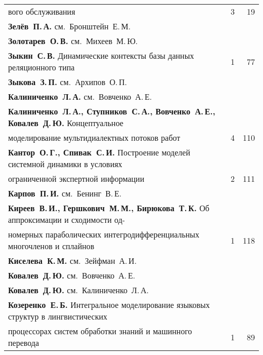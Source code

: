 {\begin{tabular}{p{388pt}rr}
\hspace*{23pt}во\-го обслуживания\dotfill&3&19\\
\textbf{Зелёв~П.\,А.} см.\ Бронштейн~Е.\,М.&&\\
\textbf{Золотарев~О.\,В.} см.\ Михеев~М.\,Ю.&&\\
\textbf{Зыкин~С.\,В.} Динамические контексты базы данных реляционного типа\dotfill&1&77\\
\textbf{Зыкова~З.\,П.} см.\ Архипов~О.\,П.&&\\
\textbf{Калиниченко~Л.\,А.} см.\ Вовченко~А.\,Е.&&\\
\textbf{Калиниченко~Л.\,А., Ступников~С.\,А., Вовченко~А.\,Е., Ковалев~Д.\,Ю.}
Концептуальное\linebreak
\vspace*{-12pt}\\
\hspace*{23pt}моделирование мультидиалектных потоков работ\dotfill&4&110\\
\textbf{Кантор~О.\,Г., Спивак~С.\,И.} Построение моделей системной динамики в
условиях\linebreak
\vspace*{-12pt}\\
\hspace*{23pt}ограниченной экспертной информации\dotfill&2&111\\
\textbf{Карпов~П.\,И.} см.\ Бенинг~В.\,Е.&&\\
\hangindent=23pt\noindent\textbf{Киреев~В.\,И., Гершкович~М.\,М., Бирюкова~Т.\,К.} Об аппроксимации и
сходимости од-\linebreak
\vspace*{-12pt}\\
\hspace*{23pt}номерных параболических интегродифференциальных многочленов и
сплайнов %
&1&118\\
\textbf{Киселева~К.\,М.} см.\ Зейфман~А.\,И.&&\\
\textbf{Ковалев~Д.\,Ю.} см.\ Вовченко~А.\,Е.&&\\
\textbf{Ковалев~Д.\,Ю.} см.\ Калиниченко~Л.\,А.&&\\
\textbf{Козеренко~Е.\,Б.} Интегральное моделирование языковых структур в
лингвистических\linebreak
\vspace*{-12pt}\\
\hspace*{23pt}процессорах систем обработки знаний и машинного перевода\dotfill&1&89\\

\end{tabular}}
